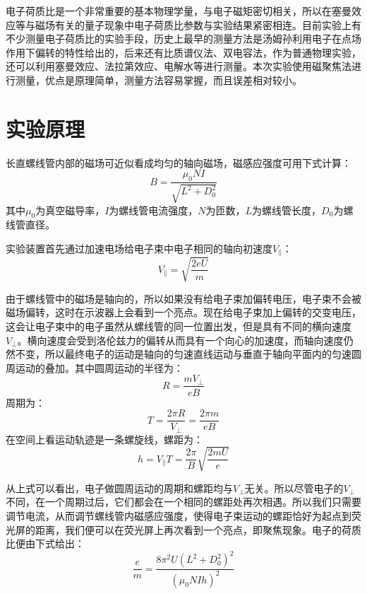 \documentclass{WHUReport}
\begin{document}
\begin{multicols}{2}
	电子荷质比是一个非常重要的基本物理学量，与电子磁矩密切相关，所以在塞曼效应等与磁场有关的量子现象中电子荷质比参数与实验结果紧密相连。目前实验上有不少测量电子荷质比的实验手段，历史上最早的测量方法是汤姆孙利用电子在点场作用下偏转的特性给出的，后来还有比质谱仪法、双电容法，作为普通物理实验，还可以利用塞曼效应、法拉第效应、电解水等进行测量。本次实验使用磁聚焦法进行测量，优点是原理简单，测量方法容易掌握，而且误差相对较小。
	\section{实验原理}
	长直螺线管内部的磁场可近似看成均匀的轴向磁场，磁感应强度可用下式计算：
	\begin{equation}
		B=\frac{\mu_0 N I}{\sqrt{L^2+D_0^2}}
	\end{equation}
	其中$\mu_0$为真空磁导率，$I$为螺线管电流强度，$N$为匝数，$L$为螺线管长度，$D_0$为螺线管直径。
	
	实验装置首先通过加速电场给电子束中电子相同的轴向初速度$V_\parallel $：
	\begin{equation}
		V_{\parallel }=\sqrt{\frac{2e U}{m}}
	\end{equation}
	
	由于螺线管中的磁场是轴向的，所以如果没有给电子束加偏转电压，电子束不会被磁场偏转，这时在示波器上会看到一个亮点。现在给电子束加上偏转的交变电压，这会让电子束中的电子虽然从螺线管的同一位置出发，但是具有不同的横向速度$V_\perp$。横向速度会受到洛伦兹力的偏转从而具有一个向心的加速度，而轴向速度仍然不变，所以最终电子的运动是轴向的匀速直线运动与垂直于轴向平面内的匀速圆周运动的叠加。其中圆周运动的半径为：
	\begin{equation}
		R=\frac{mV_\perp}{e B}
	\end{equation}
	周期为：
	\begin{equation}
		T=\frac{2\pi R}{V_\perp}=\frac{2\pi m}{eB}
	\end{equation}
	在空间上看运动轨迹是一条螺旋线，螺距为：
	\begin{equation}
		h=V_\parallel T=\frac{2\pi}{B}\sqrt{\frac{2mU}{e}}
	\end{equation}
	
	从上式可以看出，电子做圆周运动的周期和螺距均与$V_\perp$无关。所以尽管电子的$V_\perp$不同，在一个周期过后，它们都会在一个相同的螺距处再次相遇。所以我们只需要调节电流，从而调节螺线管内磁感应强度，使得电子束运动的螺距恰好为起点到荧光屏的距离，我们便可以在荧光屏上再次看到一个亮点，即聚焦现象。电子的荷质比便由下式给出：
	\begin{equation}
		\frac{e}{m}=\frac{8\pi^2 U\left(L^2+D_0^2\right)^2}{\left(\mu_0 NIh\right)^2}
	\end{equation}
	

\end{multicols}
\end{document}
